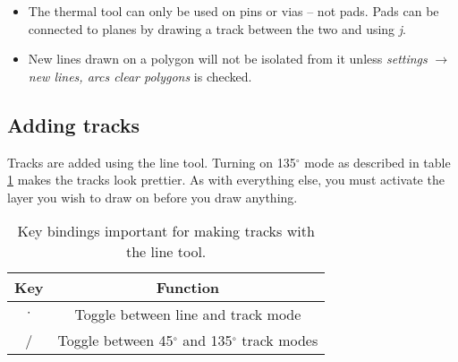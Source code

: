 \begin{itemize}
	\item The thermal tool can only be used on pins or vias -- not pads.  Pads can be connected to planes by drawing a track between the two and using \textsl{j}.
	\item New lines drawn on a polygon will not be isolated from it unless \textsl{settings} $\rightarrow$ \textsl{new lines, arcs clear polygons} is checked.
\end{itemize}


\subsection{Adding tracks}
Tracks are added using the line tool.  Turning on 135$^\circ$ mode as described in table \ref{track_table} makes the tracks look prettier.  As with everything else, you must activate the layer you wish to draw on before you draw anything.

\begin{table}[htb]
\begin{center}
\begin{tabular}{|c|c|}\hline
Key	&Function \\ \hline \hline

$\cdot$	&\parbox[c][1.5\height][c]{5cm}{Toggle between line and track mode}\\ \hline

/	&\parbox[c][1.5\height][c]{5cm}{Toggle between 45$^\circ$ and 135$^\circ$ track modes}\\ \hline
\end{tabular}
\end{center}
\caption{Key bindings important for making tracks with the line tool.\label{track_table}}
\end{table}

